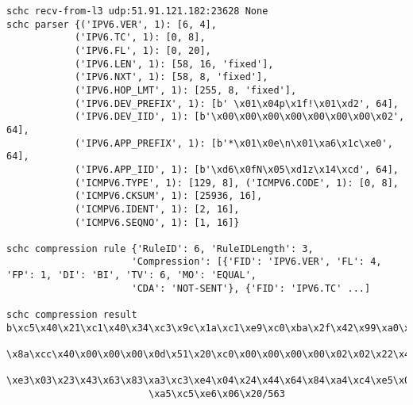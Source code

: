 \begin{lstlisting}[basicstyle=\ttfamily\tiny, numbers=none]
schc recv-from-l3 udp:51.91.121.182:23628 None
schc parser {('IPV6.VER', 1): [6, 4], 
            ('IPV6.TC', 1): [0, 8], 
            ('IPV6.FL', 1): [0, 20], 
            ('IPV6.LEN', 1): [58, 16, 'fixed'], 
            ('IPV6.NXT', 1): [58, 8, 'fixed'], 
            ('IPV6.HOP_LMT', 1): [255, 8, 'fixed'], 
            ('IPV6.DEV_PREFIX', 1): [b' \x01\x04p\x1f!\x01\xd2', 64], 
            ('IPV6.DEV_IID', 1): [b'\x00\x00\x00\x00\x00\x00\x00\x02', 64], 
            ('IPV6.APP_PREFIX', 1): [b'*\x01\x0e\n\x01\xa6\x1c\xe0', 64], 
            ('IPV6.APP_IID', 1): [b'\xd6\x0fN\x05\xd1z\x14\xcd', 64], 
            ('ICMPV6.TYPE', 1): [129, 8], ('ICMPV6.CODE', 1): [0, 8], 
            ('ICMPV6.CKSUM', 1): [25936, 16], 
            ('ICMPV6.IDENT', 1): [2, 16], 
            ('ICMPV6.SEQNO', 1): [1, 16]} 
            
schc compression rule {'RuleID': 6, 'RuleIDLength': 3, 
                      'Compression': [{'FID': 'IPV6.VER', 'FL': 4, 'FP': 1, 'DI': 'BI', 'TV': 6, 'MO': 'EQUAL',  
                      'CDA': 'NOT-SENT'}, {'FID': 'IPV6.TC' ...]

schc compression result b\xc5\x40\x21\xc1\x40\x34\xc3\x9c\x1a\xc1\xe9\xc0\xba\x2f\x42\x99\xa0\x00\x40\x00\x31\x38
                         \x8a\xcc\x40\x00\x00\x00\x0d\x51\x20\xc0\x00\x00\x00\x00\x02\x02\x22\x42\x62\x82\xa2\xc2
                         \xe3\x03\x23\x43\x63\x83\xa3\xc3\xe4\x04\x24\x44\x64\x84\xa4\xc4\xe5\x05\x25\x45\x65\x85
                         \xa5\xc5\xe6\x06\x20/563


\end{lstlisting}
